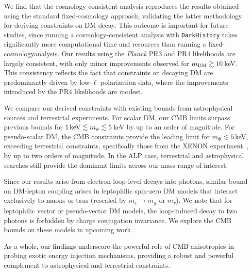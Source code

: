 We find that the cosmology-consistent analysis reproduces the results obtained using the standard fixed-cosmology approach, validating the latter methodology for deriving constraints on DM decay.
This outcome is important for future studies, since running a cosmology-consistent analysis with \texttt{DarkHistory} takes significantly more computational time and resources than running a fixed-cosmology\linebreak analysis.
Our results using the \textit{Planck} PR3 and PR4 likelihoods are largely consistent, with only minor improvements observed for $m_{\rm{DM}} \gtrsim 10\,$keV.
This consistency reflects the fact that constraints on decaying DM are predominantly driven by low-$\ell$ polarization data, where the improvements introduced by the PR4 likelihoods are modest.

We compare our derived constraints with existing bounds from astrophysical sources and terrestrial experiments.
For scalar DM, our CMB limits surpass previous bounds for $1\,{\rm keV} \lesssim m_{\phi} \lesssim 5\,$keV by up to an order of magnitude. For pseudo-scalar DM, the CMB constraints provide the leading limit for $m_{\Phi} \lesssim 5\,$keV, exceeding terrestrial constraints, specifically those from the XENON experiment~\cite{XENON:2019gfn, XENON:2020rca, XENON:2021myl, XENONCollaboration:2022kmb}, by up to two orders of magnitude.
In the ALP case, terrestrial and astrophysical searches still provide the dominant limits across our mass range of interest.

Since our results arise from electron loop-level decays into photons, similar bound on DM-lepton coupling arises in leptophilic spin-zero DM models that interact exclusively to muons or taus (rescaled by $m_e \rightarrow m_\mu$ or $m_\tau$).
We note that for leptophilic vector or pseudo-vector DM models, the loop-induced decay to two photons is forbidden by charge conjugation invariance. We explore the CMB bounds on these models in upcoming work.

As a whole, our findings underscore the powerful role of CMB anisotropies in probing exotic energy injection mechanisms, providing a robust and powerful complement to astrophysical and terrestrial constraints.


